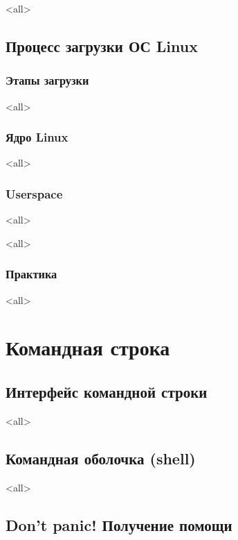 \mode<all>{}

\section{Процесс загрузки ОС Linux}

\subsection{Этапы загрузки}

\mode<all>{}

\subsection{Ядро Linux}

\mode<all>{}

\subsection{Userspace}

\mode<all>{}

\mode<all>{}

\subsection{Практика}

\mode<all>{}


\chapter{Командная строка}

\section{Интерфейс командной строки}
\mode<all>{}

\section{Командная оболочка (shell)}

\mode<all>{}

\section{Don't panic! Получение помощи}

